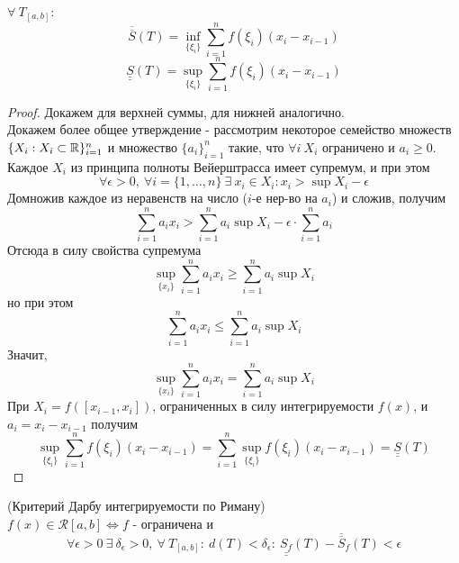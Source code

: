 \begin{numlemma} $\forall\ T_{[a,b]}:$
    \[\overline{\overline{S}}(T)=\inf\limits_{\{\xi_i\}}\sum\limits_{i=1}^{n}f(\xi_i)(x_i-x_{i-1})\]
    \[\underline{\underline{S}}(T)=\sup\limits_{\{\xi_i\}}\sum\limits_{i=1}^{n}f(\xi_i)(x_i-x_{i-1})\]
\end{numlemma} 
\begin{proof}
    Докажем для верхней суммы, для нижней аналогично.\\ Докажем более общее утверждение - рассмотрим некоторое семейство множеств $\{X_i: X_i\subset \mathbb{R}\}_{i=1}^n$ и множество $\{a_i\}_{i=1}^n$ такие, что $\forall i \ X_i$ ограничено и $a_i \geq 0$.\\
    Каждое $X_i$ из принципа полноты Вейерштрасса имеет супремум, и при этом
    \[\forall \epsilon>0,\ \forall i=\{1,\dots,n\}\ \exists\ x_i\in X_i: x_i>\sup X_i-\epsilon\] 
    Домножив каждое из неравенств на число ($i$-е нер-во на $a_i$) и сложив, получим
    \[\sum\limits_{i=1}^{n}a_i x_i>\sum\limits_{i=1}^{n}a_i \sup X_i-\epsilon\cdot \sum\limits_{i=1}^{n}a_i\] 
    Отсюда в силу свойства супремума
    \[\sup\limits_{\{x_i\}} \sum\limits_{i=1}^{n}a_i x_i\geq \sum\limits_{i=1}^{n}a_i \sup X_i\]
    но при этом
    \[\sum\limits_{i=1}^{n}a_i x_i \leq \sum\limits_{i=1}^{n} a_i\sup X_i\]
    Значит,
    \[\sup\limits_{\{x_i\}} \sum\limits_{i=1}^{n}a_i x_i=\sum\limits_{i=1}^{n}a_i \sup X_i\]
    При $X_i = f([x_{i-1}, x_i])$, ограниченных в силу интегрируемости $f(x)$, и\\
    $a_i = x_i - x_{i-1}$ получим
    \[\sup\limits_{\{\xi_i\}}\sum\limits_{i=1}^{n}f(\xi_i)(x_i-x_{i-1}) = \sum\limits_{i=1}^{n}\sup\limits_{\{\xi_i\}}f(\xi_i)(x_i-x_{i-1}) = \underline{\underline{S}}(T)\]
\end{proof} 
\begin{theorem} (Критерий Дарбу интегрируемости по Риману)\\
    $f(x)\in \mathcal{R}[a,b] \Leftrightarrow f$ - ограничена и 
    \[\forall \epsilon>0\ \exists\ \delta_{\epsilon}>0,\ \forall\ T_{[a,b]}:\ d(T)<\delta_{\epsilon}:\ \underline{\underline{S_f}}(T)-\overline{\overline{S}}_f(T)<\epsilon\]
\end{theorem} 
